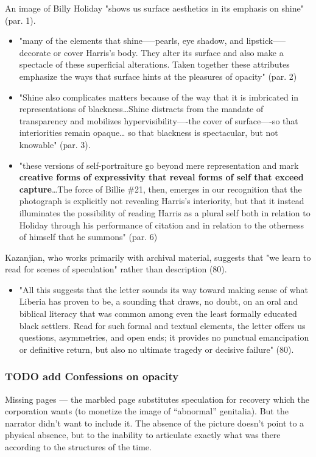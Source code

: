 \documentclass[11pt]{article}
\begin{document}
An image of Billy Holiday "shows us surface aesthetics in its emphasis
on shine" (par. 1).
\begin{itemize}
\item "many of the elements that shine—--pearls, eye shadow, and
lipstick--—decorate or cover Harris’s body. They alter its surface and
also make a spectacle of these superficial alterations. Taken
together these attributes emphasize the ways that surface hints at
the pleasures of opacity" (par. 2)
\item "Shine also complicates matters because of the way that it is
imbricated in representations of blackness\ldots{}Shine distracts from
the mandate of transparency and mobilizes hypervisibility—-the
cover of surface—-so that interiorities remain opaque\ldots{} so that
blackness is spectacular, but not knowable" (par. 3).
\item "these versions of self-portraiture go beyond mere representation
and mark \textbf{creative forms of expressivity that reveal forms of self
that exceed capture}\ldots{}The force of Billie \#21, then, emerges in
our recognition that the photograph is explicitly not revealing
Harris’s interiority, but that it instead illuminates the
possibility of reading Harris as a plural self both in relation to
Holiday through his performance of citation and in relation to the
otherness of himself that he summons" (par. 6)
\end{itemize}

Kazanjian, who works primarily with archival material, suggests that
"we learn to read for scenes of speculation" rather than description
(80).
\begin{itemize}
\item "All this suggests that the letter sounds its way toward making
sense of what Liberia has proven to be, a sounding that draws, no
doubt, on an oral and biblical literacy that was common among even
the least formally educated black settlers. Read for such formal and
textual elements, the letter offers us questions, asymmetries, and
open ends; it provides no punctual emancipation or definitive
return, but also no ultimate tragedy or decisive failure" (80).
\end{itemize}

\subsubsection{{\bfseries\sffamily TODO} add Confessions on opacity}
\label{sec:org8c97847}
Missing pages --- the marbled page substitutes speculation for recovery which the corporation wants (to monetize the image of “abnormal” genitalia). But the narrator didn’t want to include it. The absence of the picture doesn’t point to a physical absence, but to the inability to articulate exactly what was there according to the structures of the time.
\end{document}
